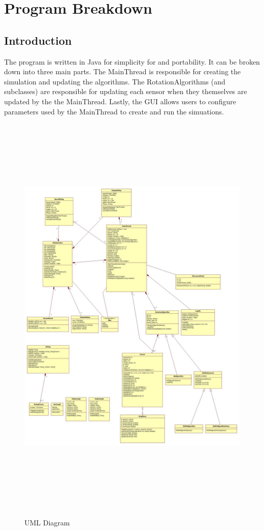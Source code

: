 \section{Program Breakdown}

\subsection{Introduction}
The program is written in Java for simplicity for and portability. It can be broken 
down into three main parts. The MainThread is responsible for creating the simulation and 
updating the algorithms. The RotationAlgorithms (and subclasses) are responsible for updating 
each sensor when they themselves are updated by the the MainThread. Lastly, the GUI allows 
users to configure parameters used by the MainThread to create and run the simuations.

\begin{figure}
\centering
\caption{UML Diagram}
\includegraphics[height = 20cm]{pics/Main.jpg}\\[0.5cm]    
\end{figure}

